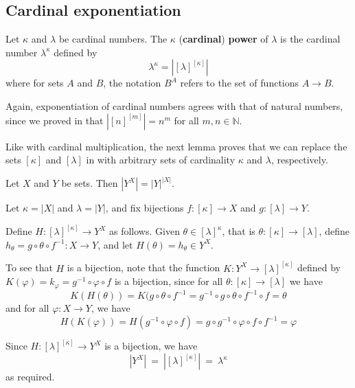 \subsection*{Cardinal exponentiation}

\begin{definition}
\label{defCardinalExponential}
Let $\kappa$ and $\lambda$ be cardinal numbers. The $\kappa$\supth{} (\textbf{cardinal}) \textbf{power} of $\lambda$ is the cardinal number $\lambda^{\kappa}$ defined by
\[ \lambda^{\kappa} = |[\lambda]^{[\kappa]}|\]
where for sets $A$ and $B$, the notation $B^A$ refers to the set of functions $A \to B$.
\end{definition}

Again, exponentiation of cardinal numbers agrees with that of natural numbers, since we proved in  that $|[n]^{[m]}| = n^m$ for all $m,n \in \mathbb{N}$.

Like with cardinal multiplication, the next lemma proves that we can replace the sets $[\kappa]$ and $[\lambda]$ in  with arbitrary sets of cardinality $\kappa$ and $\lambda$, respectively.

\begin{lemma}
\label{lemCardinalityOfFunctionSet}
Let $X$ and $Y$ be sets. Then $|Y^X| = |Y|^{|X|}$.
\end{lemma}

\begin{cproof}
Let $\kappa = |X|$ and $\lambda = |Y|$, and fix bijections $f : [\kappa] \to X$ and $g : [\lambda] \to Y$.

Define $H : [\lambda]^{[\kappa]} \to Y^X$ as follows. Given $\theta \in [\lambda]^{\kappa}$, that is $\theta : [\kappa] \to [\lambda]$, define $h_{\theta} = g \circ \theta \circ f^{-1} : X \to Y$, and let $H(\theta) = h_{\theta} \in Y^X$.

To see that $H$ is a bijection, note that the function $K : Y^X \to [\lambda]^{[\kappa]}$ defined by $K(\varphi) = k_{\varphi} = g^{-1} \circ \varphi \circ f$ is a bijection, since for all $\theta : [\kappa] \to [\lambda]$ we have
\[ K(H(\theta)) = K(g \circ \theta \circ f^{-1} = g^{-1} \circ g \circ \theta \circ f^{-1} \circ f = \theta \]
and for all $\varphi : X \to Y$, we have
\[ H(K(\varphi)) = H(g^{-1} \circ \varphi \circ f) = g \circ g^{-1} \circ \varphi \circ f \circ f^{-1} = \varphi \]

Since $H : [\lambda]^{[\kappa]} \to Y^X$ is a bijection, we have
\[ |Y^X| ~=~ |[\lambda]^{[\kappa]}| ~=~ \lambda^{\kappa}\]
as required.
\end{cproof}

